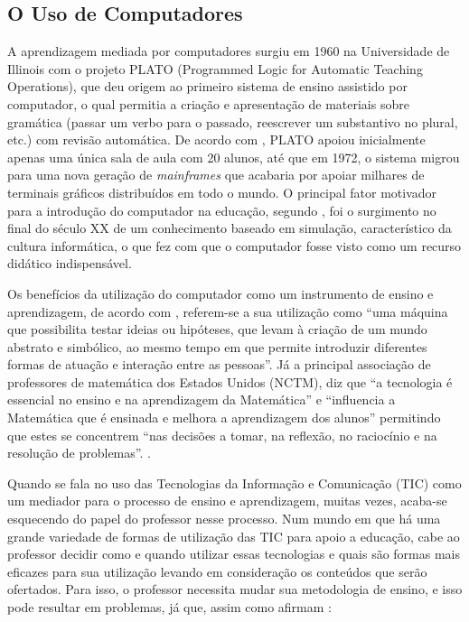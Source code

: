 \subsection{O Uso de Computadores}

A aprendizagem mediada por computadores surgiu em 1960 na Universidade de Illinois com o projeto PLATO (Programmed Logic for Automatic Teaching Operations)\cite{bitzer1961plato}, que deu origem ao primeiro sistema de ensino assistido por computador, o qual permitia a criação e apresentação de materiais sobre gram\'atica (passar um verbo para o passado, reescrever um substantivo no plural, etc.) com revisão automática. De acordo com , PLATO apoiou inicialmente apenas uma única sala de aula com 20 alunos, até que em 1972, o sistema migrou para uma nova geração de \textit{mainframes} que acabaria por apoiar milhares de terminais gráficos distribuídos em todo o mundo. O principal fator motivador para a introdução do computador na educação, segundo , foi o surgimento no final do século XX de um conhecimento baseado em simulação, característico da cultura informática, o que fez com que o computador fosse visto como  um recurso didático  indispensável.

Os benefícios da utilização do computador como um instrumento de ensino e aprendizagem, de acordo com , referem-se a sua utilização como ``uma máquina que 
possibilita testar ideias ou hipóteses, que levam à criação de um mundo abstrato e simbólico, ao mesmo tempo em que permite introduzir diferentes formas de atuação e interação entre as pessoas''. Já a 
principal associação de professores de matemática dos Estados Unidos (NCTM), diz que ``a tecnologia é essencial no ensino e 
na aprendizagem da Matemática'' e ``influencia a Matemática que é ensinada e melhora a aprendizagem dos alunos'' permitindo que estes se concentrem ``nas decisões a tomar, na reflexão, no raciocínio e 
na resolução de problemas''. \cite[p.26]{melo2007principios}.

Quando se fala no uso das Tecnologias da Informação e Comunicação (TIC) como um mediador para o processo de ensino e aprendizagem, muitas vezes, acaba-se esquecendo do papel do professor nesse 
processo. Num mundo em que há uma grande variedade de formas de utilização das TIC para apoio a educação, cabe ao professor decidir como e quando utilizar essas tecnologias e quais s\~ao formas 
mais eficazes para sua utilização levando em consideração os conteúdos que serão ofertados. Para isso, o professor necessita mudar sua metodologia de ensino, e isso pode resultar em problemas, já 
que, assim como afirmam :

